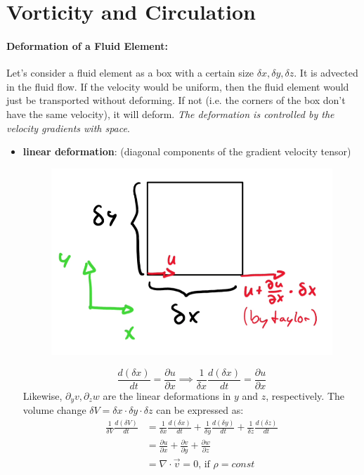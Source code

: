 \section{Vorticity and Circulation}
\paragraph{Deformation of a Fluid Element:} Let's consider a fluid element as a box with a certain size $\delta x, \delta y, \delta z$. It is advected in the fluid flow. If the velocity would be uniform, then the fluid element would just be transported without deforming. If not (i.e. the corners of the box don't have the same velocity), it will deform. \textit{The deformation is controlled by the velocity gradients with space}.

\begin{itemize}
	\setlength{\itemsep}{-5pt}
	\item \textbf{linear deformation}: (diagonal components of the gradient velocity tensor)
	\begin{figure}[H]
		\centering
		\includegraphics[width=0.4\linewidth]{Sketches/LinearDeformation}
		\caption{}
		\label{fig:lineardeformation}
	\end{figure}
	\begin{equation*}
		\frac{d(\delta x)}{d t} = \frac{\partial u}{\partial x} \implies \frac{1}{\delta x} \frac{d (\delta x)}{d t} = \frac{\partial u}{\partial x}
	\end{equation*}
	Likewise, $\partial_y v, \partial_z w$ are the linear deformations in $y$ and $z$, respectively. The volume change $\delta V = \delta x\cdot \delta y \cdot \delta z $ can be expressed as:
	\begin{equation*}
	\begin{split}
		   \frac{1}{\delta V}\frac{d(\delta V)}{dt}  
		&= \frac{1}{\delta x}\frac{d(\delta x)}{dt} + \frac{1}{\delta y}\frac{d(\delta y)}{dt}+\frac{1}{\delta z}\frac{d(\delta z)}{dt} \\
		&= \frac{\partial u}{\partial x} + \frac{\partial v}{\partial y } + \frac{\partial w}{\partial z}\\
		&= \nabla \cdot \vec v = 0\text{, if $\rho=const$}

\end{split}
\end{equation*}
\end{itemize}
